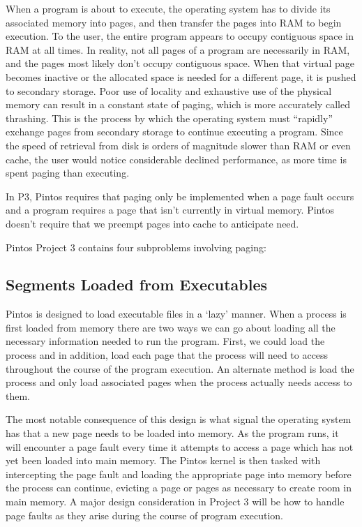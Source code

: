 \documentclass[11pt, letterpaper]{article}
\begin{document}
When a program is about to execute, the operating system has to divide its associated memory into pages, and then transfer the pages into RAM to begin execution. To the user, the entire program appears to occupy contiguous space in RAM at all times. In reality, not all pages of a program are necessarily in RAM, and the pages most likely don’t occupy contiguous space. When that virtual page becomes inactive or the allocated space is needed for a different page, it is pushed to secondary storage. Poor use of locality and exhaustive use of the physical memory can result in a constant state of paging, which is more accurately called thrashing. This is the process by which the operating system must “rapidly” exchange pages from secondary storage to continue executing a program. Since the speed of retrieval from disk is orders of magnitude slower than RAM or even cache, the user would notice considerable declined performance, as more time is spent paging than executing. 

In P3, Pintos requires that paging only be implemented when a page fault occurs and a program requires a page that isn’t currently in virtual memory. Pintos doesn’t require that we preempt pages into cache to anticipate need.

Pintos Project 3 contains four subproblems involving paging:

\subsection{Segments Loaded from Executables}
Pintos is designed to load executable files in a ‘lazy’ manner. When a process is first loaded from memory there are two ways we can go about loading all the necessary information needed to run the program. First, we could load the process and in addition, load each page that the process will need to access throughout the course of the program execution. An alternate method is load the process and only load associated pages when the process actually needs access to them.

The most notable consequence of this design is what signal the operating system has that a new page needs to be loaded into memory. As the program runs, it will encounter a page fault every time it attempts to access a page which has not yet been loaded into main memory. The Pintos kernel is then tasked with intercepting the page fault and loading the appropriate page into memory before the process can continue, evicting a page or pages as necessary to create room in main memory. A major design consideration in Project 3 will be how to handle page faults as they arise during the course of program execution. 
\end{document}
